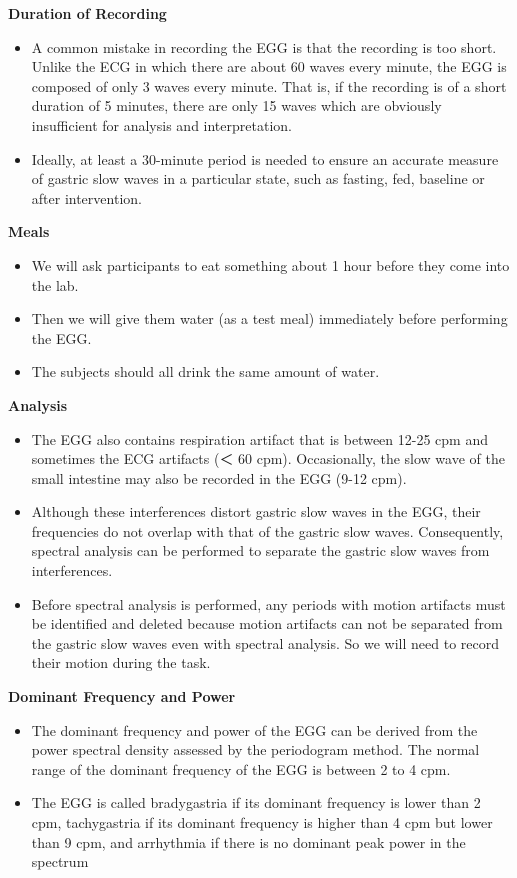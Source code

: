 \documentclass[]{book}
\providecommand{\tightlist}{%
  \setlength{\itemsep}{0pt}\setlength{\parskip}{0pt}}
\begin{document}
\textbf{Duration of Recording}

\begin{itemize}
\tightlist
\item
  A common mistake in recording the EGG is that the recording is too short. Unlike the ECG in which there are about 60 waves every minute, the EGG is composed of only 3 waves every minute. That is, if the recording is of a short duration of 5 minutes, there are only 15 waves which are obviously insufficient for analysis and interpretation.
\item
  Ideally, at least a 30-minute period is needed to ensure an accurate measure of gastric slow waves in a particular state, such as fasting, fed, baseline or after intervention.
\end{itemize}

\textbf{Meals}

\begin{itemize}
\tightlist
\item
  We will ask participants to eat something about 1 hour before they come into the lab.
\item
  Then we will give them water (as a test meal) immediately before performing the EGG.
\item
  The subjects should all drink the same amount of water.
\end{itemize}

\textbf{Analysis}

\begin{itemize}
\tightlist
\item
  The EGG also contains respiration artifact that is between 12-25 cpm and sometimes the ECG artifacts (＜ 60 cpm). Occasionally, the slow wave of the small intestine may also be recorded in the EGG (9-12 cpm).
\item
  Although these interferences distort gastric slow waves in the EGG, their frequencies do not overlap with that of the gastric slow waves. Consequently, spectral analysis can be performed to separate the gastric slow waves from interferences.
\item
  Before spectral analysis is performed, any periods with motion artifacts must be identified and deleted because motion artifacts can not be separated from the gastric slow waves even with spectral analysis. So we will need to record their motion during the task.
\end{itemize}

\textbf{Dominant Frequency and Power}

\begin{itemize}
\tightlist
\item
  The dominant frequency and power of the EGG can be derived from the power spectral density assessed by the periodogram method. The normal range of the dominant frequency of the EGG is between 2 to 4 cpm.
\item
  The EGG is called bradygastria if its dominant frequency is lower than 2 cpm, tachygastria if its dominant frequency is higher than 4 cpm but lower than 9 cpm, and arrhythmia if there is no dominant peak power in the spectrum
\end{itemize}
\end{document}
